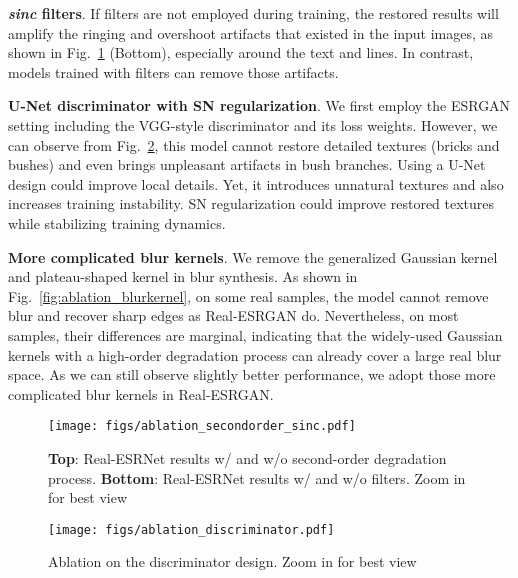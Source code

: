 \documentclass[10pt,twocolumn,letterpaper]{article}
\begin{document}
\noindent\textbf{\textit{sinc} filters}.
If  filters are not employed during training, the restored results will amplify the ringing and overshoot artifacts that existed in the input images, as shown in Fig.~\ref{fig:ablation_secondorder_sinc} (Bottom), especially around the text and lines. In contrast, models trained with  filters can remove those artifacts.

\noindent\textbf{U-Net discriminator with SN regularization}.
We first employ the ESRGAN setting including the VGG-style discriminator and its loss weights. However, we can observe from Fig.~\ref{fig:ablation_discriminator}, this model cannot restore detailed textures (bricks and bushes) and even brings unpleasant artifacts in bush branches. Using a U-Net design could improve local details. Yet, it introduces unnatural textures and also increases training instability. SN regularization could improve restored textures while stabilizing training dynamics.

\noindent\textbf{More complicated blur kernels}.
We remove the generalized Gaussian kernel and plateau-shaped kernel in blur synthesis. As shown in Fig.~\ref{fig:ablation_blurkernel}, on some real samples, the model cannot remove blur and recover sharp edges as Real-ESRGAN do. Nevertheless, on most samples, their differences are marginal, indicating that the widely-used Gaussian kernels with a high-order degradation process can already cover a large real blur space. As we can still observe slightly better performance, we adopt those more complicated blur kernels in Real-ESRGAN.

\begin{figure}[t]
	\vspace{-0.2cm}
	\begin{center}
\texttt{[image: figs/ablation\_secondorder\_sinc.pdf]}
	\end{center}
	\vspace{-0.6cm}
	\caption{\textbf{Top}: Real-ESRNet results w/ and w/o second-order degradation process. \textbf{Bottom}: Real-ESRNet results w/ and w/o  filters. Zoom in for best view}
	\label{fig:ablation_secondorder_sinc}
	\vspace{-0.5cm}
\end{figure}


\begin{figure}[t]
	\vspace{-0.2cm}
	\begin{center}
\texttt{[image: figs/ablation\_discriminator.pdf]}
	\end{center}
	\vspace{-0.7cm}
	\caption{Ablation on the discriminator design. Zoom in for best view}
	\label{fig:ablation_discriminator}
	\vspace{-0.2cm}
\end{figure}
\end{document}
